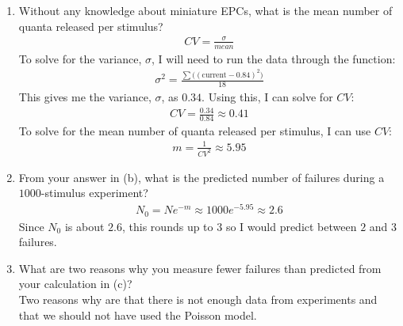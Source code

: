 \documentclass[11pt]{article}
\begin{document}
\begin{enumerate}[label=\arabic*.]
\begin{enumerate}[label=(\alph*)]
\item
Without any knowledge about miniature EPCs, what is the mean number of quanta released per stimulus?
\begin{align*}
CV = \frac{\sigma} {mean}
\end{align*}
To solve for the variance, $\sigma$, I will need to run the data through the function:
\begin{align*}
\sigma ^ 2 = \frac{\sum {((\text{current} - 0.84) ^ 2})} {18}
\end{align*}
This gives me the variance, $\sigma$, as $0.34$. Using this, I can solve for $CV$:
\begin{align*}
CV = \frac{0.34} {0.84} \approx 0.41
\end{align*}
To solve for the mean number of quanta released per stimulus, I can use $CV$:
\begin{align*}
m = \frac{1} {CV ^ 2} \approx 5.95
\end{align*}



\item
From your answer in (b), what is the predicted number of failures during a $1000$-stimulus experiment?
\begin{align*}
N_0 = N e^{-m} \approx 1000 e^{-5.95} \approx 2.6
\end{align*}
Since $N_0$ is about $2.6$, this rounds up to $3$ so I would predict between $2$ and $3$ failures.



\item
What are two reasons why you measure fewer failures than predicted from your calculation in (c)?
\vspace*{1\baselineskip}
\\
Two reasons why are that there is not enough data from experiments and that we should not have used the Poisson model.
\end{enumerate}




\end{enumerate}
\end{document}

